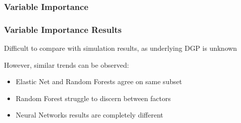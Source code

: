 \documentclass[aspectratio=169]{beamer}
\begin{document}


\subsubsection{Variable Importance}

\begin{frame}
\frametitle{Variable Importance Results}
Difficult to compare with simulation results, as underlying DGP is unknown

However, similar trends can be observed:
\begin{itemize}
	\item Elastic Net and Random Forests agree on same subset
	\item Random Forest struggle to discern between factors
	\item Neural Networks results are completely different
\end{itemize}
\end{frame}

\end{document}
